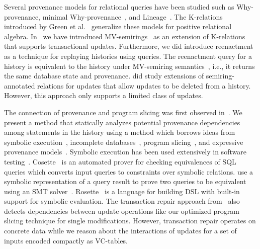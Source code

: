 Several provenance models for relational queries have been studied such as Why-provenance, minimal Why-provenance~\cite{BK01}, and Lineage~\cite{CW00b}. The K-relations introduced by Green et al.~\cite{GK07} generalize these models for positive relational algebra.
In~\cite{AG14,AG17,AG18} we have introduced  MV-semirings~\cite{AG14,AG17,AG18} as an extension of K-relations that supports transactional updates. Furthermore, we did introduce reenactment as a technique for replaying histories using queries. The reenactment query for a history is equivalent to the  history under MV-semiring semantics~\cite{AG14,AG17,AG18}, i.e., it returns the same database state and provenance. \cite{bourhis-20-eqinalphupq} did study extensions of semiring-annotated relations for updates that allow updates to be deleted from a history. However, this approach only supports a limited class of updates.

The connection of provenance and program slicing was %
first observed in~\cite{cheney07}.
We present a method that statically analyzes potential provenance dependencies among statements in the history using a method which borrows ideas from symbolic execution~\cite{bucur14,K76,luckow14}, incomplete databases~\cite{AG85, IL84a, pip10, lenses15}, program slicing~\cite{W81}, and expressive provenance models~\cite{AD11d}.
Symbolic execution has been used extensively in software testing~\cite{cadar13}.
Cosette~\cite{chu2017} is an automated prover for checking equivalences of SQL queries which converts input queries to constraints over symbolic relations.
\cite{zhou-19-autvqequssm} use a symbolic representation of a query result to prove two queries to be equivalent using an SMT solver~\cite{moura-11-smt}.
Rosette~\cite{torlak2014} is a
language for building DSL with built-in support for symbolic evaluation.
The transaction repair approach from~\cite{dashti17} also detects dependencies between update operations like our optimized program slicing technique for single modifications. However, transaction repair operates on concrete data while we reason about the interactions of updates for a set of inputs encoded compactly as VC-tables.

